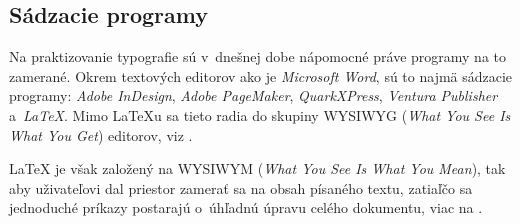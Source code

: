 \documentclass[11pt]{article}
\begin{document}
\subsection{Sádzacie programy}

Na praktizovanie typografie sú v~dnešnej dobe nápomocné práve programy na to zamerané. Okrem textových editorov ako je \emph{Microsoft Word}, sú to najmä sádzacie programy: \emph{Adobe InDesign}, \emph{Adobe PageMaker}, \emph{QuarkXPress}, \emph{Ventura Publisher} a~\emph{\LaTeX}. Mimo \LaTeX{}u sa tieto radia do skupiny WYSIWYG (\emph{What You See Is What You Get}) editorov, viz \cite{programy}.\par
\LaTeX{} je však založený na WYSIWYM (\emph{What You See Is What You Mean}), tak aby uživateľovi dal priestor zamerať sa na obsah písaného textu, zatiaľčo sa jednoduché príkazy postarajú o~úhľadnú úpravu celého dokumentu, viac na \cite{overleaf}.




\end{document}
